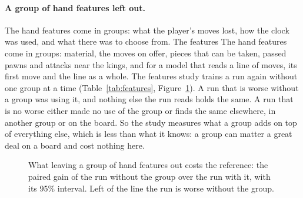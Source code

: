 \iffeatures
\paragraph{A group of hand features left out.}
\ifsequence
The hand features come in groups: what the player's moves lost, how the clock
was used, and what there was to choose from. The features
\else
The hand features come in groups: material, the moves on offer, pieces that
can be taken, passed pawns and attacks near the kings, and for a model that
reads a line of moves, its first move and the line as a whole. The features
\fi
study trains a run again without one group at a time
(Table~\ref{tab:features}, Figure~\ref{fig:features}). A run that is worse
without a group was using it, and nothing else the run reads holds the same.
A run that is no worse either made no use of the group or finds the same
elsewhere, in another group or on the board. So the study measures what a
group adds on top of everything else, which is less than what it knows: a
group can matter a great deal on a board and cost nothing here.

\begin{table}[htbp]\centering\footnotesize
{}
\caption{The features study. Each run reads every hand feature but one
group. Its gain is paired with the run that reads them all: below zero the
run is worse without the group, and bold when the 95\% interval leaves zero
out. The group whose loss costs most comes first.}
\label{tab:features}
\end{table}

\begin{figure}[htbp]\centering
{}
\caption{What leaving a group of hand features out costs the reference: the
paired gain of the run without the group over the run with it, with its 95\%
interval. Left of the line the run is worse without the group.}
\label{fig:features}
\end{figure}
\fi
